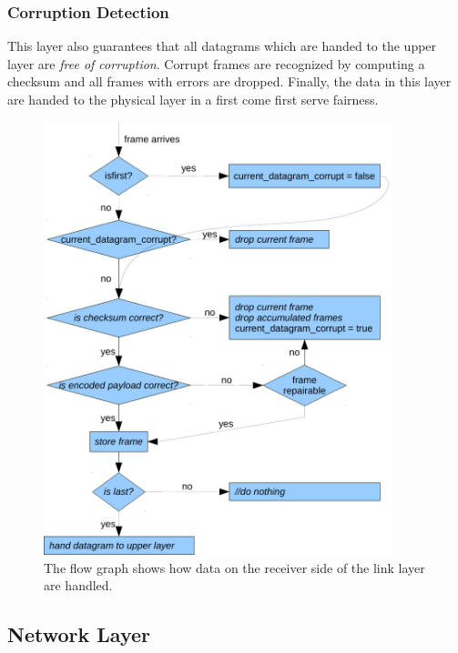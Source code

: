  \subsubsection{Corruption Detection}
  This layer also guarantees that all datagrams which are handed to the upper layer are \emph{free of corruption}. Corrupt frames are recognized by computing a checksum and all frames with errors are dropped.  Finally, the data in this layer are handed to the physical layer in a first come first serve fairness. 

\begin{figure}
  \centering
  \includegraphics[width=0.9\textwidth]{images/flowgraph_link_layer_receiver.pdf}
  \caption[Receiver side of link layer]{ The flow graph shows how data on the receiver side of the link layer are handled.}
  \label{fig:receiver-side-link-layer}
\end{figure}

\subsection{Network Layer}

